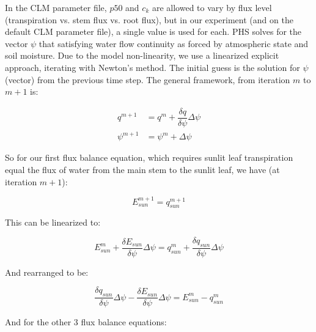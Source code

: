 \documentclass[draft,linenumbers]{agujournal}
\begin{document}
In the CLM parameter file, $p50$ and $c_k$ are allowed to vary by flux level (transpiration vs. stem flux vs. root flux), but in our experiment (and on the default CLM parameter file), a single value is used for each.
PHS solves for the vector $\psi$
that satisfying water flow continuity as forced by atmospheric state and soil moisture.
Due to the model non-linearity, we use a linearized explicit approach, iterating with Newton's method. 
The initial guess is the solution for $\psi$ (vector) from the previous time step. 
The general framework, from iteration $m$ to $m+1$ is:

   \begin{linenomath*} \begin{equation} 
   \begin{aligned}
   q^{m+1}&=q^m+\dfrac{\delta q}{\delta\psi}\Delta\psi \\
   \psi^{m+1}&=\psi^{m}+\Delta\psi
   \end{aligned}
   \end{equation} \end{linenomath*}

So for our first flux balance equation, which requires sunlit leaf transpiration equal the flux of water from the main stem to the sunlit leaf, we have (at iteration $m+1$):

   \begin{linenomath*} \begin{equation} 
   E_{sun}^{m+1}=q_{sun}^{m+1}
   \end{equation} \end{linenomath*}

This can be linearized to:

   \begin{linenomath*} \begin{equation} 
   E_{sun}^{m}+\dfrac{\delta E_{sun}}{\delta\psi}\Delta\psi=q_{sun}^{m}+\dfrac{\delta q_{sun}}{\delta\psi}\Delta\psi
   \end{equation} \end{linenomath*}

And rearranged to be:

   \begin{linenomath*} \begin{equation} 
   \dfrac{\delta q_{sun}}{\delta\psi}\Delta\psi-\dfrac{\delta E_{sun}}{\delta\psi}\Delta\psi=E_{sun}^{m}-q_{sun}^{m}
   \end{equation} \end{linenomath*}

And for the other 3 flux balance equations:
\end{document}
